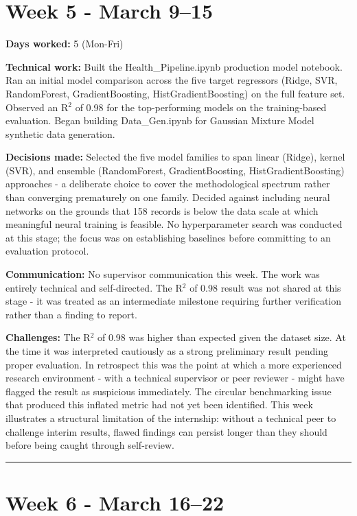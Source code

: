 \documentclass[11pt,a4paper]{article}
\begin{document}
\section{Week 5  -  March 9–15}

\textbf{Days worked:} 5 (Mon-Fri)

\textbf{Technical work:} Built the Health\_Pipeline.ipynb production model notebook. Ran an initial model comparison across the five target regressors (Ridge, SVR, RandomForest, GradientBoosting, HistGradientBoosting) on the full feature set. Observed an R$^{2}$ of 0.98 for the top-performing models on the training-based evaluation. Began building Data\_Gen.ipynb for Gaussian Mixture Model synthetic data generation.

\textbf{Decisions made:} Selected the five model families to span linear (Ridge), kernel (SVR), and ensemble (RandomForest, GradientBoosting, HistGradientBoosting) approaches  -  a deliberate choice to cover the methodological spectrum rather than converging prematurely on one family. Decided against including neural networks on the grounds that 158 records is below the data scale at which meaningful neural training is feasible. No hyperparameter search was conducted at this stage; the focus was on establishing baselines before committing to an evaluation protocol.

\textbf{Communication:} No supervisor communication this week. The work was entirely technical and self-directed. The R$^{2}$ of 0.98 result was not shared at this stage  -  it was treated as an intermediate milestone requiring further verification rather than a finding to report.

\textbf{Challenges:} The R$^{2}$ of 0.98 was higher than expected given the dataset size. At the time it was interpreted cautiously as a strong preliminary result pending proper evaluation. In retrospect this was the point at which a more experienced research environment  -  with a technical supervisor or peer reviewer  -  might have flagged the result as suspicious immediately. The circular benchmarking issue that produced this inflated metric had not yet been identified. This week illustrates a structural limitation of the internship: without a technical peer to challenge interim results, flawed findings can persist longer than they should before being caught through self-review.

\noindent\rule{\textwidth}{0.4pt}


\section{Week 6  -  March 16–22}
\end{document}
